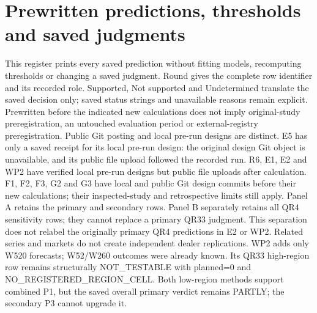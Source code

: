 \clearpage
\section{Prewritten predictions, thresholds and saved judgments}\label{sup:submission-predictions}
This register prints every saved prediction without fitting models, recomputing thresholds or changing a saved judgment. Round gives the complete row identifier and its recorded role. Supported, Not supported and Undetermined translate the saved decision only; saved status strings and unavailable reasons remain explicit.
Prewritten before the indicated new calculations does not imply original-study preregistration, an untouched evaluation period or external-registry preregistration. Public Git posting and local pre-run designs are distinct. E5 has only a saved receipt for its local pre-run design: the original design Git object is unavailable, and its public file upload followed the recorded run. R6, E1, E2 and WP2 have verified local pre-run designs but public file uploads after calculation. F1, F2, F3, G2 and G3 have local and public Git design commits before their new calculations; their inspected-study and retrospective limits still apply.
Panel A retains the primary and secondary rows. Panel B separately retains all QR4 sensitivity rows; they cannot replace a primary QR33 judgment. This separation does not relabel the originally primary QR4 predictions in E2 or WP2. Related series and markets do not create independent dealer replications.
WP2 adds only W520 forecasts; W52/W260 outcomes were already known. Its QR33 high-region row remains structurally NOT\_TESTABLE with planned=0 and NO\_REGISTERED\_REGION\_CELL. Both low-region methods support combined P1, but the saved overall primary verdict remains PARTLY; the secondary P3 cannot upgrade it.
\begingroup
\fontsize{8.5}{10.2}\selectfont
\setlength{\tabcolsep}{2pt}
\renewcommand{\arraystretch}{1.12}
\setlength{\LTcapwidth}{\linewidth}
